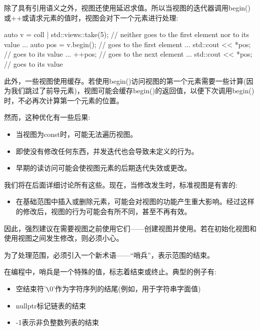 
除了具有引用语义之外，视图还使用延迟求值。所以当视图的迭代器调用begin()或++或请求元素的值时，视图会对下一个元素进行处理:

\begin{cpp}
auto v = coll | std::views::take(5); // neither goes to the first element nor to its value
...
auto pos = v.begin(); // goes to the first element
...
std::cout << *pos; // goes to its value
...
++pos; // goes to the next element
...
std::cout << *pos; // goes to its value
\end{cpp}


此外，一些视图使用缓存。若使用begin()访问视图的第一个元素需要一些计算(因为我们跳过了前导元素)，视图可能会缓存begin()的返回值，以便下次调用begin()时，不必再次计算第一个元素的位置。

然而，这种优化有一些后果:

\begin{itemize}
\item
当视图为const时，可能无法遍历视图。

\item
即使没有修改任何东西，并发迭代也会导致未定义的行为。

\item
早期的读访问可能会使视图元素的后期迭代失效或更改。
\end{itemize}

我们将在后面详细讨论所有这些。现在，当修改发生时，标准视图是有害的:

\begin{itemize}
\item
在基础范围中插入或删除元素，可能会对视图的功能产生重大影响。经过这样的修改后，视图的行为可能会有所不同，甚至不再有效。
\end{itemize}

因此，强烈建议在需要视图之前使用它们——创建视图并使用。若在初始化视图和使用视图之间发生修改，则必须小心。


为了处理范围，必须引入一个新术语——“哨兵”，表示范围的结束。

在编程中，哨兵是一个特殊的值，标志着结束或终止。典型的例子有:

\begin{itemize}
\item
空结束符'\verb|\|0'作为字符序列的结尾(例如，用于字符串字面值)

\item
nullptr标记链表的结束

\item
-1表示非负整数列表的结束
\end{itemize}

